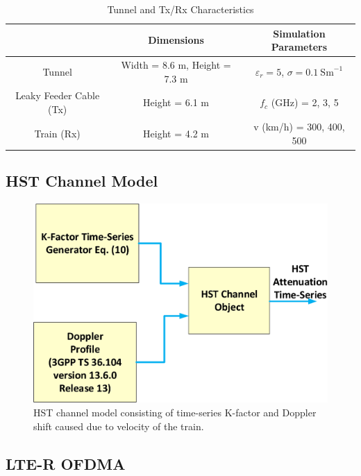 \begin{table}[t!]
\centering
\caption{Tunnel and Tx/Rx Characteristics}
\begin{tabular}{c  c  c }
   & Dimensions & Simulation Parameters\\\hline
Tunnel & Width = 8.6 m, Height = 7.3 m & $\varepsilon_r = 5$, $\sigma = 0.1~\textrm{Sm}^{-1}$\\\hline
Leaky Feeder Cable (Tx) & Height = 6.1 m & $f_c$ (GHz) = 2, 3, 5\\\hline
Train (Rx) & Height = 4.2 m &  v (km/h) = 300, 400, 500\\
\hline
\end{tabular}
\label{tablelter}
\end{table}


\subsection{HST Channel Model}

\begin{figure}[!ht]
\label{subblock}
\centering
\includegraphics[width=\linewidth,keepaspectratio]{images/Gill/lte_figs/subblock.eps} 
\caption{HST channel model consisting of time-series K-factor and Doppler shift caused due to velocity of the train.}
\end{figure}

\subsection{LTE-R OFDMA}

